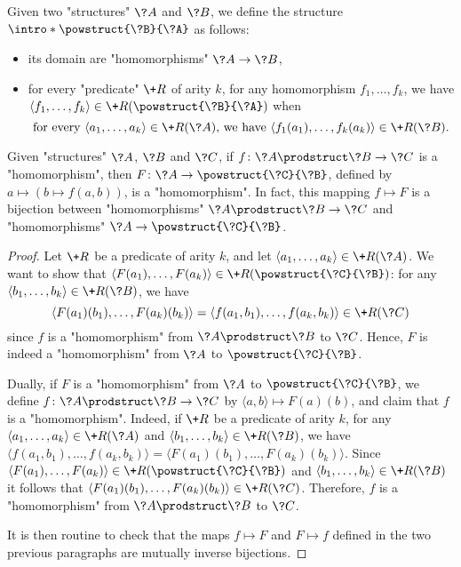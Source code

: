 Given two "structures" $\?A$ and $\?B$, we define the structure \AP$\intro*\powstruct{\?B}{\?A}$ as follows:
\begin{itemize}
  \item its domain are "homomorphisms" $\?A \to \?B$,
  \item for every "predicate" $\+R$ of arity $k$, for any homomorphism $f_1,\hdots,f_k$,
  we have $\langle f_1,\hdots,f_k\rangle \in \+R(\powstruct{\?B}{\?A})$ when 
  \[
	\text{for every }
	\langle a_1,\hdots,a_k\rangle \in \+R(\?A)
	\text{, we have }
	\langle f_1(a_1), \hdots, f_k(a_k) \rangle \in \+R(\?B).
  \]
\end{itemize}


\begin{proposition}
	\AP\label{prop:currying-hom}
	Given "structures" $\?A$, $\?B$ and $\?C$, if $f\colon \?A\prodstruct \?B \to \?C$
	is a "homomorphism", then $F\colon \?A \to \powstruct{\?C}{\?B}$,
	defined by $a \mapsto (b \mapsto f(a,b))$, is a "homomorphism".
	In fact, this mapping $f \mapsto F$ is a bijection
	between "homomorphisms" $\?A\prodstruct \?B \to \?C$
	and "homomorphisms" $\?A \to \powstruct{\?C}{\?B}$.
\end{proposition}

\begin{proof}
Let $\+R$ be a predicate of arity $k$, and let
$\langle a_1,\hdots,a_k \rangle \in \+R(\?A)$.
We want to show that $\langle F(a_1),\hdots,F(a_k) \rangle \in \+R(\powstruct{\?C}{\?B})$:
for any $\langle b_1,\hdots,b_k \rangle \in \+R(\?B)$, we have
\[\langle F(a_1)(b_1), \hdots, F(a_k)(b_k)\rangle = \langle f(a_1,b_1),\hdots,f(a_k,b_k) \rangle \in \+R(\?C)\] since $f$ is a "homomorphism" from $\?A\prodstruct \?B$ to $\?C$.
Hence, $F$ is indeed a "homomorphism" from $\?A$ to $\powstruct{\?C}{\?B}$.

Dually, if $F$ is a "homomorphism" from $\?A$ to $\powstruct{\?C}{\?B}$,
we define $f\colon \?A\prodstruct \?B \to \?C$ by $\langle a,b \rangle \mapsto F(a)(b)$,
and claim that $f$ is a "homomorphism". Indeed, if $\+R$ be a predicate of arity $k$,
for any $\langle a_1, \hdots, a_k \rangle \in \+R(\?A)$
and $\langle b_1, \hdots, b_k \rangle \in \+R(\?B)$,
we have $\langle f(a_1,b_1), \hdots, f(a_k,b_k) \rangle
= \langle F(a_1)(b_1), \hdots, F(a_k)(b_k) \rangle$.
Since $\langle F(a_1), \hdots, F(a_k) \rangle \in \+R(\powstruct{\?C}{\?B})$
and $\langle b_1, \hdots,b_k \rangle \in \+R(\?B)$ 
it follows that $\langle F(a_1)(b_1), \hdots, F(a_k)(b_k) \rangle \in \+R(\?C)$.
Therefore, $f$ is a "homomorphism" from $\?A \prodstruct \?B$ to $\?C$.

It is then routine to check that the maps $f \mapsto F$ and $F \mapsto f$ defined
in the two previous paragraphs are mutually inverse bijections.
\end{proof}

